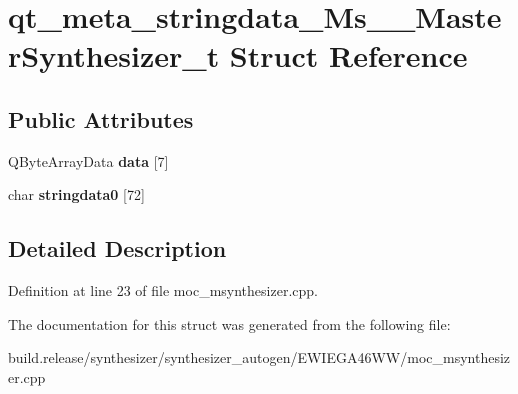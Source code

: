 \hypertarget{structqt__meta__stringdata___ms_____master_synthesizer__t}{}\section{qt\+\_\+meta\+\_\+stringdata\+\_\+\+Ms\+\_\+\+\_\+\+Master\+Synthesizer\+\_\+t Struct Reference}
\label{structqt__meta__stringdata___ms_____master_synthesizer__t}
\subsection*{Public Attributes}
\begin{DoxyCompactItemize}
\item 
\mbox{\label{structqt__meta__stringdata___ms_____master_synthesizer__t_a5e1d0caad30f4692311343af87966c09}} 
Q\+Byte\+Array\+Data {\bfseries data} \mbox{[}7\mbox{]}
\item 
\mbox{\label{structqt__meta__stringdata___ms_____master_synthesizer__t_ae2b8f899564d6b07e37e4d4622118379}} 
char {\bfseries stringdata0} \mbox{[}72\mbox{]}
\end{DoxyCompactItemize}


\subsection{Detailed Description}


Definition at line 23 of file moc\+\_\+msynthesizer.\+cpp.



The documentation for this struct was generated from the following file\+:\begin{DoxyCompactItemize}
\item 
build.\+release/synthesizer/synthesizer\+\_\+autogen/\+E\+W\+I\+E\+G\+A46\+W\+W/moc\+\_\+msynthesizer.\+cpp\end{DoxyCompactItemize}
